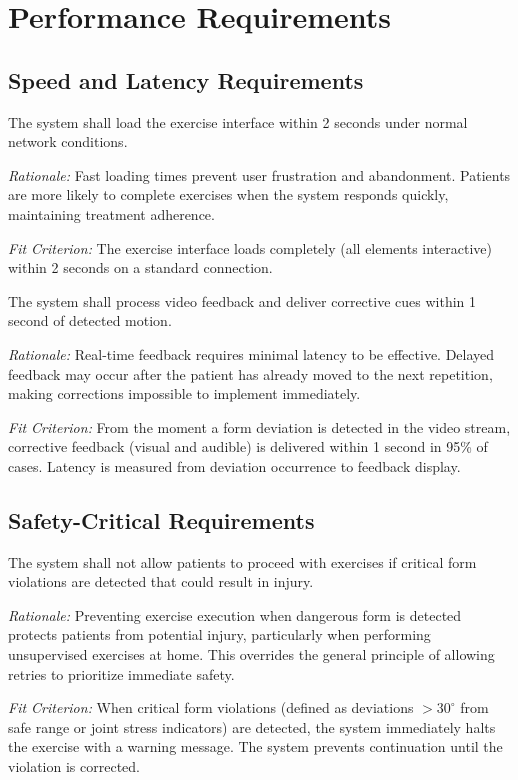 \documentclass[12pt]{article}
\newcommand{\rationale}[1]{\par\emph{Rationale:} #1}
\newcommand{\fitcrit}[1]{\par\emph{Fit Criterion:} #1}
\begin{document}
\section{Performance Requirements}

\subsection{Speed and Latency Requirements}
\begin{reqlist}
	\item[PR-SL 1.] The system shall load the exercise interface within 2 seconds under normal network conditions.
	\rationale{Fast loading times prevent user frustration and abandonment. Patients are more likely to complete exercises when the system responds quickly, maintaining treatment adherence.}
	\fitcrit{The exercise interface loads completely (all elements interactive) within 2 seconds on a standard connection.}
	
	\item[PR-SL 2.] The system shall process video feedback and deliver corrective cues within 1 second of detected motion.
	\rationale{Real-time feedback requires minimal latency to be effective. Delayed feedback may occur after the patient has already moved to the next repetition, making corrections impossible to implement immediately.}
	\fitcrit{From the moment a form deviation is detected in the video stream, corrective feedback (visual and audible) is delivered within 1 second in 95\% of cases. Latency is measured from deviation occurrence to feedback display.}
\end{reqlist}

\subsection{Safety-Critical Requirements}
\begin{reqlist}
	\item[PR-SCR 1.] The system shall not allow patients to proceed with exercises if critical form violations are detected that could result in injury.
	\rationale{Preventing exercise execution when dangerous form is detected protects patients from potential injury, particularly when performing unsupervised exercises at home. This overrides the general principle of allowing retries to prioritize immediate safety.}
	\fitcrit{When critical form violations (defined as deviations $>30^\circ$ from safe range or joint stress indicators) are detected, the system immediately halts the exercise with a warning message. The system prevents continuation until the violation is corrected.}
\end{reqlist}
\end{document}
